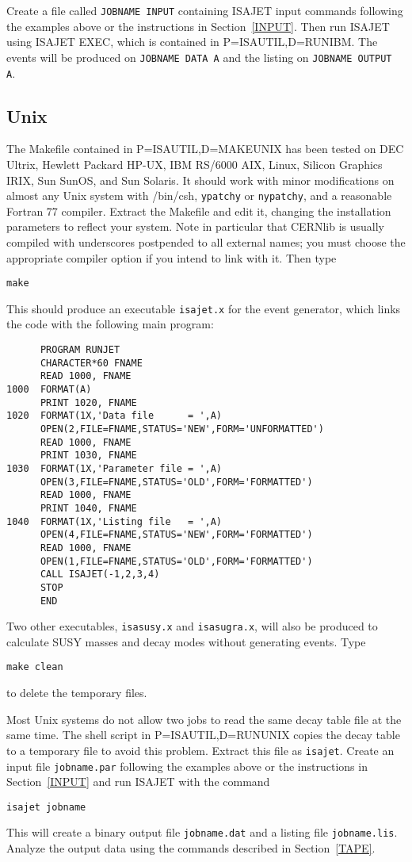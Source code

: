       Create a file called \verb|JOBNAME INPUT| containing ISAJET
input commands following the examples above or the instructions in
Section~\ref{INPUT}. Then run ISAJET using ISAJET EXEC, which is
contained in P=ISAUTIL,D=RUNIBM.  The events will be produced on
\verb|JOBNAME DATA A| and the listing on \verb|JOBNAME OUTPUT A|.

\subsection{Unix}

      The Makefile contained in P=ISAUTIL,D=MAKEUNIX has been tested
on DEC Ultrix, Hewlett Packard HP-UX, IBM RS/6000 AIX, Linux, Silicon
Graphics IRIX, Sun SunOS, and Sun Solaris. It should work with minor
modifications on almost any Unix system with /bin/csh, \verb|ypatchy|
or \verb|nypatchy|, and a reasonable Fortran 77 compiler. Extract the
Makefile and edit it, changing the installation parameters to reflect
your system. Note in particular that CERNlib is usually compiled with
underscores postpended to all external names; you must choose the
appropriate compiler option if you intend to link with it. Then type
\begin{verbatim}
make
\end{verbatim}
This should produce an executable \verb|isajet.x| for the event
generator, which links the code with the following main program:
\begin{verbatim}
      PROGRAM RUNJET
      CHARACTER*60 FNAME
      READ 1000, FNAME
1000  FORMAT(A)
      PRINT 1020, FNAME
1020  FORMAT(1X,'Data file      = ',A)
      OPEN(2,FILE=FNAME,STATUS='NEW',FORM='UNFORMATTED')
      READ 1000, FNAME
      PRINT 1030, FNAME
1030  FORMAT(1X,'Parameter file = ',A)
      OPEN(3,FILE=FNAME,STATUS='OLD',FORM='FORMATTED')
      READ 1000, FNAME
      PRINT 1040, FNAME
1040  FORMAT(1X,'Listing file   = ',A)
      OPEN(4,FILE=FNAME,STATUS='NEW',FORM='FORMATTED')
      READ 1000, FNAME
      OPEN(1,FILE=FNAME,STATUS='OLD',FORM='FORMATTED')
      CALL ISAJET(-1,2,3,4)
      STOP
      END
\end{verbatim}
Two other executables, \verb|isasusy.x| and \verb|isasugra.x|, will
also be produced to calculate SUSY masses and decay modes without
generating events. Type
\begin{verbatim}
make clean
\end{verbatim}
to delete the temporary files.

      Most Unix systems do not allow two jobs to read the same decay
table file at the same time. The shell script in P=ISAUTIL,D=RUNUNIX
copies the decay table to a temporary file to avoid this problem.
Extract this file as \verb|isajet|. Create an input file
\verb|jobname.par| following the examples above or the instructions in
Section~\ref{INPUT} and run ISAJET with the command
\begin{verbatim}
isajet jobname
\end{verbatim}
This will create a binary output file \verb|jobname.dat| and a listing
file \verb|jobname.lis|. Analyze the output data using the commands
described in Section~\ref{TAPE}.

